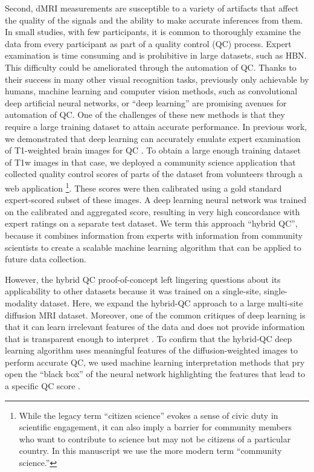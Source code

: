 \documentclass[fleqn,10pt]{wlscirep}
\begin{document}
Second, dMRI measurements are susceptible to a variety of artifacts that affect
the quality of the signals and the ability to make accurate inferences from them.
In small studies, with few participants, it is common to thoroughly examine the
data from every participant as part of a quality control (QC) process. Expert
examination is time consuming and is prohibitive in large datasets, such as HBN.
This difficulty could be ameliorated through the automation of QC. Thanks to
their success in many other visual recognition tasks, previously only achievable
by humans, machine learning and computer vision methods, such as convolutional
deep artificial neural networks, or ``deep learning'' \cite{lecun2015deep}
are promising avenues for automation of QC. One
of the challenges of these new methods is that they require a large training
dataset to attain accurate performance. In previous work, we demonstrated that
deep learning can accurately emulate expert examination of T1-weighted brain
images for QC \cite{keshavan2019-er}. To obtain a large enough training dataset of
T1w images in that case, we deployed a community science application that
collected quality control scores of parts of the dataset from volunteers through
a web application \footnote{%
    While the legacy term ``citizen science'' evokes a sense of civic duty in
    scientific engagement, it can also imply a barrier for community members who
    want to contribute to science but may not be citizens of a particular
    country.  In this manuscript we use the more modern term ``community
    science.''
}.
These scores were then calibrated using a gold standard expert-scored subset of
these images. A deep learning neural network was trained on the calibrated and
aggregated score, resulting in very high concordance with expert ratings on a
separate test dataset. We term this approach ``hybrid QC'', because it combines
information from experts with information from community scientists to create a
scalable machine learning algorithm that can be applied to future data
collection.

However, the hybrid QC proof-of-concept left lingering questions about its
applicability to other datasets because it was trained on a single-site,
single-modality dataset.  Here, we expand the hybrid-QC approach to a large
multi-site diffusion MRI dataset. Moreover, one of the common critiques of deep
learning is that it can learn irrelevant features of the data and does not
provide information that is transparent enough to interpret
\cite{lipton2017doctor, salahuddin2022transparency, Zech2018-ki}. To confirm
that the hybrid-QC deep learning algorithm uses meaningful features of the
diffusion-weighted images to perform accurate QC, we used machine learning
interpretation methods that pry open the ``black box'' of the neural network
highlighting the features that lead to a specific QC score
\cite{sundararajan2017axiomatic,murdoch2019definitions}.
\end{document}
